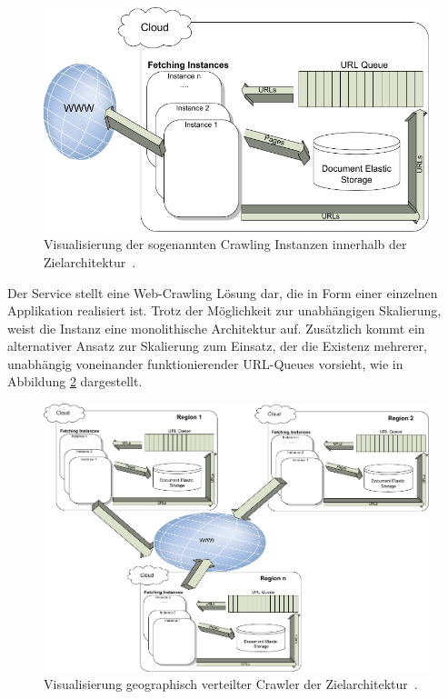 \begin{figure}[H]
    \centering
    \includegraphics[width=13cm]{images/20_related/group-MC15.pdf}
    \caption[Visualisierung von Crawling Instanzen]{Visualisierung der sogenannten Crawling Instanzen innerhalb der Zielarchitektur~\parencite[vgl.][S. 4]{ElAraby2018}.}
    \label{fig:CrawlerServiceElAraby1}
\end{figure}
Der Service stellt eine Web-Crawling Lösung dar, die in Form einer einzelnen Applikation realisiert ist. Trotz der Möglichkeit zur unabhängigen Skalierung, weist die Instanz eine monolithische Architektur auf. Zusätzlich kommt ein alternativer Ansatz zur Skalierung zum Einsatz, der die Existenz mehrerer, unabhängig voneinander funktionierender URL-Queues vorsieht, wie in Abbildung \ref{fig:CrawlerServiceElArabyGlobal} dargestellt.

\begin{figure}[H]
    \centering
    \includegraphics[width=13cm]{images/20_related/group-MC17.pdf}
    \caption[Visualisierung geographisch verteilter Crawler]{Visualisierung geographisch verteilter Crawler der Zielarchitektur~\parencite[vgl.][S. 4]{ElAraby2018}.}
    \label{fig:CrawlerServiceElArabyGlobal}
\end{figure}

